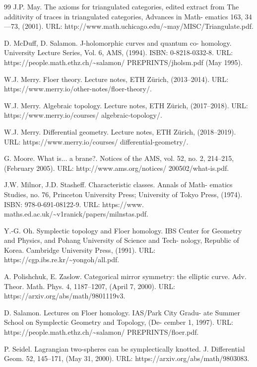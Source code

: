 \begin{thebibliography}{99}
 J.P. May. The axioms for triangulated categories, edited extract from The additivity of traces in triangulated categories, Advances in Math- ematics 163, 34—73, (2001). URL: http://www.math.uchicago.edu/\textasciitilde{}may/MISC/Triangulate.pdf.

 D. McDuff, D. Salamon. J-holomorphic curves and quantum co- homology. University Lecture Series, Vol. 6, AMS, (1994). ISBN: 0-8218-0332-8. URL: https://people.math.ethz.ch/\textasciitilde{}salamon/ PREPRINTS/jholsm.pdf (May 1995).

 W.J. Merry. Floer theory. Lecture notes, ETH Zürich, (2013–2014). URL: https://www.merry.io/other-notes/floer-theory/.

 W.J. Merry. Algebraic topology. Lecture notes, ETH Zürich, (2017–2018). URL: https://www.merry.io/courses/ algebraic-topology/.

 W.J. Merry. Differential geometry. Lecture notes, ETH Zürich, (2018–2019). URL: https://www.merry.io/courses/ differential-geometry/.

 G. Moore. What is... a brane?. Notices of the AMS, vol. 52, no. 2, 214–215, (February 2005). URL: http://www.ams.org/notices/ 200502/what-is.pdf.

 J.W. Milnor, J.D. Stasheff. Characteristic classes. Annals of Math- ematics Studies, no. 76, Princeton University Press; University of Tokyo Press, (1974). ISBN: 978-0-691-08122-9. URL: https://www. maths.ed.ac.uk/\textasciitilde{}v1ranick/papers/milnstas.pdf.

 Y.-G. Oh. Symplectic topology and Floer homology. IBS Center for Geometry and Physics, and Pohang University of Science and Tech- nology, Republic of Korea. Cambridge University Press, (1991). URL: https://cgp.ibs.re.kr/\textasciitilde{}yongoh/all.pdf.

 A. Polishchuk, E. Zaslow. Categorical mirror symmetry: the elliptic curve. Adv. Theor. Math. Phys. 4, 1187–1207, (April 7, 2000). URL: https://arxiv.org/abs/math/9801119v3.

 D. Salamon. Lectures on Floer homology. IAS/Park City Gradu- ate Summer School on Symplectic Geometry and Topology, (De- cember 1, 1997). URL: https://people.math.ethz.ch/\textasciitilde{}salamon/ PREPRINTS/floer.pdf.

 P. Seidel. Lagrangian two-spheres can be symplectically knotted. J. Differential Geom. 52, 145–171, (May 31, 2000). URL: https://arxiv.org/abs/math/9803083.


\end{thebibliography}
